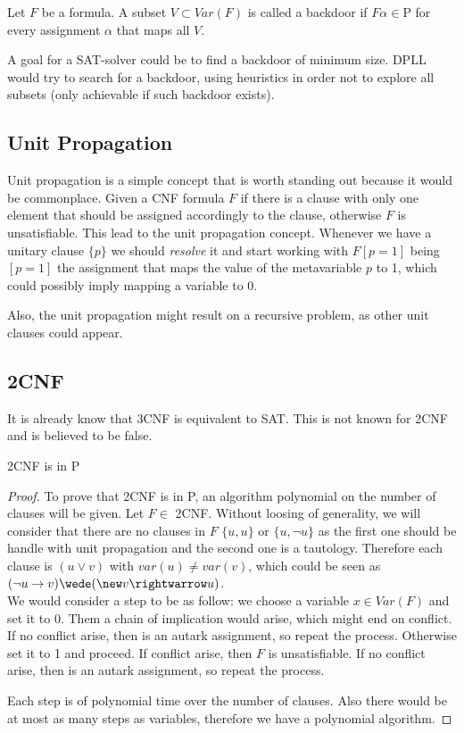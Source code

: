 \begin{definition}
  Let $F$ be a formula. A subset $ V \subset Var(F)$ is called a backdoor if $F\alpha \in \text{P}$ for every assignment $\alpha$ that maps all $V$.
\end{definition}
A goal for a SAT-solver could be to find a backdoor of minimum size. DPLL would try to search for a backdoor, using heuristics in order not to explore all subsets (only achievable if such backdoor exists).
\subsection{Unit Propagation}

Unit propagation is a simple concept that is worth standing out because it would be commonplace. Given a CNF formula $F$ if there is a clause with only one element that should be assigned accordingly to the clause, otherwise $F$ is unsatisfiable. This lead to the unit propagation concept. Whenever we have a unitary clause $\{p\}$ we should \emph{resolve} it and start working with $F[p=1]$ being $[p=1]$ the assignment that maps the value of the metavariable $p$ to 1, which could possibly imply mapping a variable to $0$.

Also, the unit propagation might result on a recursive problem, as other unit clauses could appear.

\subsection{2CNF}
It is already know that 3CNF is equivalent to SAT. This is not known for 2CNF and is believed to be false.

\begin{proposition}
  2CNF is in P 
\end{proposition}
\begin{proof}

  To prove that 2CNF is in P, an algorithm polynomial on the number of clauses will be given. Let $F \in$ 2CNF.  Without loosing of generality, we will consider that there are no clauses in $F$ $\{u,u\}$ or $\{u,\neg u\}$ as the first one should be handle with unit propagation and the second one is a tautology. Therefore each clause is $(u \vee v)$ with $var(u) \ne var(v)$, which could be seen as $(\neg u \rightarrow v) \wede (\new v \rightwarrow u)$.\\


  
  We would consider a step to be as follow: we choose a variable $x \in Var(F)$ and set it to 0. Them a chain of implication would arise, which might end on conflict. If no conflict arise, then is an autark assignment, so repeat the process. Otherwise set it to 1 and proceed. If conflict arise, then $F$ is unsatisfiable. If no conflict arise, then is an autark assignment, so repeat the process.
  

  Each step is of polynomial time over the number of clauses. Also there would be at most as many steps as variables, therefore we have a polynomial algorithm.
  
  
\end{proof}

